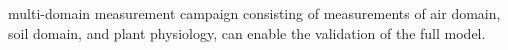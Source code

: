 multi-domain measurement campaign consisting of measurements of air domain, soil domain, and plant physiology, can enable the validation of the full model. 




